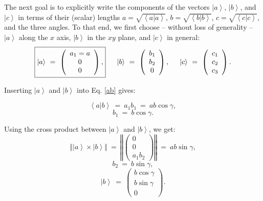 The next goal is to explicitly write the components of the vectors $\left| a \right>$, $\left| b \right>$, and $\left| c \right>$ 
in terms of their (scalar) lengths $a = \sqrt{\left< a | a \right>}$, $b = \sqrt{\left< b | b \right>}$, $c = \sqrt{\left< c | c \right>}$, 
and the three angles.
To that end, we first choose -- without loss of generality -- $\left| a \right>$ along the $x$ axis, $\left| b \right>$ in the 
$xy$ plane, and $\left| c \right>$ in general:
\begin{equation} 
	\boxed{ \left| a \right> \ =\  \left( \begin{array}{c} a_1 = a \\ 0 \\ 0 \end{array} \right), }
	\hspace{0.5cm} \left| b \right> \ =\  \left( \begin{array}{c} b_1 \\ b_2 \\ 0 \end{array} \right),
	\hspace{0.5cm} \left| c \right> \ =\  \left( \begin{array}{c} c_1 \\ c_2 \\ c_3 \end{array} \right).
\end{equation}


Inserting $\left| a \right>$ and $\left| b \right>$ into Eq. \ref{ab} gives:

\begin{equation} \left< a | b \right > \ =\  a_1 b_1 \ =\  ab \cos \gamma, \end{equation}
\begin{equation} b_1 \ =\  b \cos \gamma. \end{equation}


Using the cross product between $\left| a \right>$ and $\left| b \right>$, we get:
\begin{equation} 
	\left\Vert \left| a \right> \times \left| b \right> \right\Vert \ =\ 
	\left\Vert \left( \begin{array}{c} 0 \\ 0 \\ a_1 b_2 \end{array} \right) \right\Vert \ =\ 
	ab \sin \gamma, \label{crossab}
\end{equation}
\begin{equation} b_2 \ =\  b \sin \gamma, \end{equation}
\begin{equation} 
\boxed{ \left| b \right> \ =\  \left( \begin{array}{c} b \cos \gamma \\ b \sin \gamma \\ 0 \end{array} \right). } 
\label{bvec} 
\end{equation}


